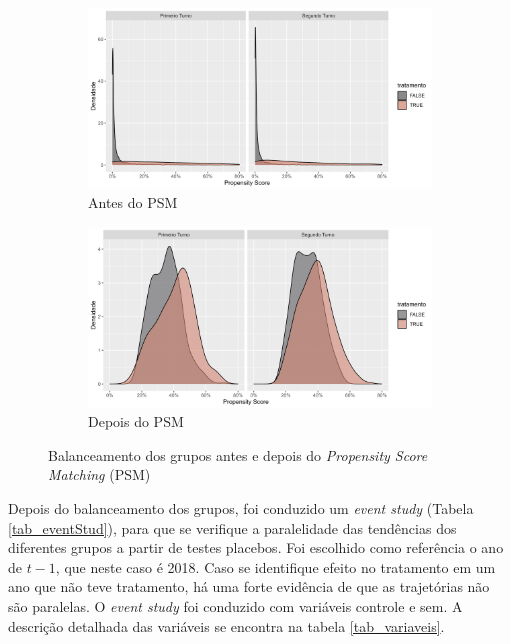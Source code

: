 \begin{figure}[!ht]
    \begin{subfigure}[t]{0.49\linewidth}
      \includegraphics[width = \linewidth]{relatorios/passe-livre/graficos/pre-propensity.png}
      \caption{Antes do PSM}
      \label{fig_prePSM}
    \end{subfigure}
    \hfill
    \begin{subfigure}[t]{0.49\linewidth}
      \includegraphics[width = \linewidth]{relatorios/passe-livre/graficos/pos-propensity.png}
      \caption{Depois do PSM}
      \label{fig_posPSM}
    \end{subfigure}
    \caption{Balanceamento dos grupos antes e depois do \textit{Propensity Score Matching} (PSM)}
    \label{fig_balanceamento}
  \end{figure}

Depois do balanceamento dos grupos, foi conduzido um \textit{event study} (Tabela \ref{tab_eventStud}), para que se verifique a paralelidade das tendências dos diferentes grupos a partir de testes placebos. Foi escolhido como referência o ano de $t-1$, que neste caso é 2018. Caso se identifique efeito no tratamento em um ano que não teve tratamento, há uma forte evidência de que as trajetórias não são paralelas. O \textit{event study} foi conduzido com variáveis controle e sem. A descrição detalhada das variáveis se encontra na tabela \ref{tab_variaveis}.

